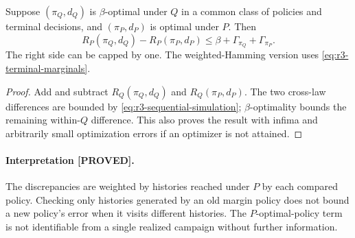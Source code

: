 \begin{theorem}
Suppose $(\pi_Q,d_Q)$ is $\beta$-optimal under $Q$ in a common class of
policies and terminal decisions, and $(\pi_P,d_P)$ is optimal under $P$.
Then
\begin{equation}
 R_P(\pi_Q,d_Q)-R_P(\pi_P,d_P)
 \leq\beta+\Gamma_{\pi_Q}+\Gamma_{\pi_P}.
 \label{eq:r3-sequential-regret}
\end{equation}
The right side can be capped by one.  The weighted-Hamming version uses
\eqref{eq:r3-terminal-marginals}.
\end{theorem}
\begin{proof}
Add and subtract $R_Q(\pi_Q,d_Q)$ and $R_Q(\pi_P,d_P)$.  The two
cross-law differences are bounded by
\eqref{eq:r3-sequential-simulation}; $\beta$-optimality bounds the remaining
within-$Q$ difference.  This also proves the result with infima and
arbitrarily small optimization errors if an optimizer is not attained.
\end{proof}

\paragraph{Interpretation [PROVED].}
The discrepancies are weighted by histories reached under $P$ by each
compared policy.  Checking only histories generated by an old margin
policy does not bound a new policy's error when it visits different
histories.  The $P$-optimal-policy term is not identifiable from a single
realized campaign without further information.

